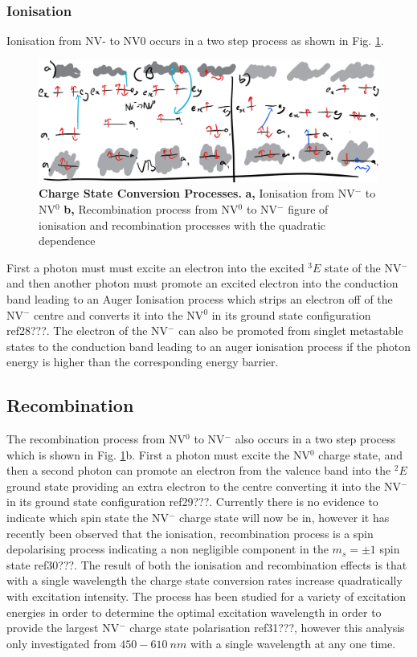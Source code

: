 \documentclass[preprint,prl]{revtex4}
\begin{document}
\subsubsection{Ionisation}
Ionisation from NV- to NV0 occurs in a two step process as shown in Fig. \ref{FigChargeConversion}.

\begin{figure}[t]
  \centering
  \includegraphics[width=1\textwidth]{ChargeConversion.png} 
 \caption{\textbf{Charge State Conversion Processes.} \textbf{a,} Ionisation from NV$^-$ to NV$^0$ \textbf{b,} Recombination process from NV$^0$ to NV$^-$ figure of ionisation and recombination processes with the quadratic dependence} \label{FigChargeConversion}
\end{figure}

First a photon must must excite an electron into the excited $^3E$ state of the NV$^-$ and then another photon must promote an excited electron into the conduction band leading to an Auger Ionisation process which strips an electron off of the NV$^-$ centre and converts it into the NV$^0$ in its ground state configuration ref28???. The electron of the NV$^-$ can also be promoted from singlet metastable states to the conduction band leading to an auger ionisation process if the photon energy is higher than the corresponding energy barrier.

\subsection{Recombination}
The recombination process from NV$^0$ to NV$^-$ also occurs in a two step process which is shown in Fig. \ref{FigChargeConversion}b. First a photon must excite the NV$^0$ charge state, and then a second photon can promote an electron from the valence band into the $^2E$ ground state providing an extra electron to the centre converting it into the NV$^-$ in its ground state configuration ref29???. Currently there is no evidence to indicate which spin state the NV$^-$ charge state will now be in, however it has recently been observed that the ionisation, recombination process is a spin depolarising process indicating a non negligible component in the $m_s=\pm1$ spin state ref30???. The result of both the ionisation and recombination effects is that with a single wavelength the charge state conversion rates increase quadratically with excitation intensity. The process has been studied for a variety of excitation energies in order to determine the optimal excitation wavelength in order to provide the largest NV$^-$ charge state polarisation ref31???, however this analysis only investigated from $\SI{450}-\SI{610}{nm}$ with a single wavelength at any one time.
\end{document}
